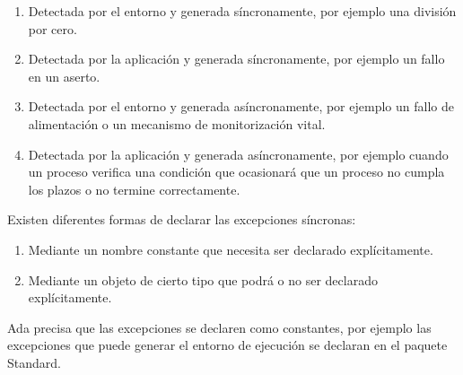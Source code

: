 \begin{enumerate}
	\item Detectada por el entorno y generada síncronamente, por ejemplo una
		división por cero.
	\item Detectada por la aplicación y generada síncronamente, por ejemplo
		un fallo en un aserto.
	\item Detectada por el entorno y generada asíncronamente, por ejemplo un
		fallo de alimentación o un mecanismo de monitorización vital.
	\item Detectada por la aplicación y generada asíncronamente, por ejemplo
		cuando un proceso verifica una condición que ocasionará que un
		proceso no cumpla los plazos o no termine correctamente.
\end{enumerate}

Existen diferentes formas de declarar las excepciones síncronas:

\begin{enumerate}
	\item Mediante un nombre constante que necesita ser declarado
		explícitamente.
	\item Mediante un objeto de cierto tipo que podrá o no ser declarado
		explícitamente.
\end{enumerate}

Ada precisa que las excepciones se declaren como constantes, por ejemplo las
excepciones que puede generar el entorno de ejecución se declaran en el paquete
Standard.

